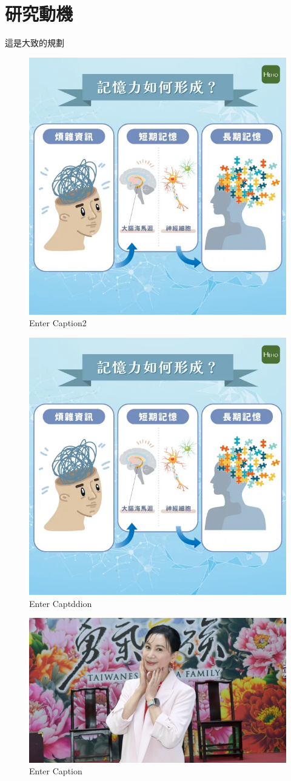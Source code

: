 \section{研究動機}

這是大致的規劃



\begin{figure}
    \centering
    \includegraphics[width=0.5\linewidth,natwidth=600,natheight=600]{figures/3ac2dbd72f1431bb1ffde8fc28724640.webp}
    \caption{Enter Caption2}
    \label{fig:enter-label2}
\end{figure}

\begin{figure}
    \centering
    \includegraphics[width=0.5\linewidth]{figures/3ac2dbd72f1431bb1ffde8fc28724640.png}
    \caption{Enter Captddion}
    \label{fig:enter-labddel}
\end{figure}

\begin{figure}
    \centering
    \includegraphics[width=0.5\linewidth]{figures/20240511141026-0fed3f0a.jpg}
    \caption{Enter Caption}
    \label{fig:enter-label}
\end{figure}




